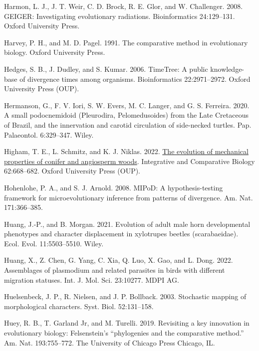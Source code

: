 \documentclass[fleqn,10pt,lineno]{wlpeerj} %
\newlength{\cslhangindent}
\newlength{\cslentryspacingunit} %
\newenvironment{CSLReferences}[2] %
 {%
  \setlength{\parindent}{0pt}
  \ifodd #1
  \let\oldpar\par
  \def\par{\hangindent=\cslhangindent\oldpar}
  \fi
  \setlength{\parskip}{#2\cslentryspacingunit}
 }%
 {}
\begin{document}
\begin{CSLReferences}{1}{0}
\leavevmode{}%
Harmon, L. J., J. T. Weir, C. D. Brock, R. E. Glor, and W. Challenger. 2008. {GEIGER}: Investigating evolutionary radiations. Bioinformatics 24:129--131. Oxford University Press.

\leavevmode{}%
Harvey, P. H., and M. D. Pagel. 1991. The comparative method in evolutionary biology. Oxford University Press.

\leavevmode{}%
Hedges, S. B., J. Dudley, and S. Kumar. 2006. {TimeTree}: A public knowledge-base of divergence times among organisms. Bioinformatics 22:2971--2972. Oxford University Press (OUP).

\leavevmode{}%
Hermanson, G., F. V. Iori, S. W. Evers, M. C. Langer, and G. S. Ferreira. 2020. A small podocnemidoid ({P}leurodira, {P}elomedusoides) from the {L}ate {C}retaceous of {B}razil, and the innervation and carotid circulation of side-necked turtles. Pap. Palaeontol. 6:329--347. Wiley.

\leavevmode{}%
Higham, T. E., L. Schmitz, and K. J. Niklas. 2022. \href{https://doi.org/10.1093/icb/icac103}{The evolution of mechanical properties of conifer and angiosperm woods}. Integrative and Comparative Biology 62:668--682. Oxford University Press ({OUP}).

\leavevmode{}%
Hohenlohe, P. A., and S. J. Arnold. 2008. {MIPoD}: A hypothesis-testing framework for microevolutionary inference from patterns of divergence. Am. Nat. 171:366--385.

\leavevmode{}%
Huang, J.-P., and B. Morgan. 2021. Evolution of adult male horn developmental phenotypes and character displacement in xylotrupes beetles (scarabaeidae). Ecol. Evol. 11:5503--5510. Wiley.

\leavevmode{}%
Huang, X., Z. Chen, G. Yang, C. Xia, Q. Luo, X. Gao, and L. Dong. 2022. Assemblages of plasmodium and related parasites in birds with different migration statuses. Int. J. Mol. Sci. 23:10277. MDPI AG.

\leavevmode{}%
Huelsenbeck, J. P., R. Nielsen, and J. P. Bollback. 2003. Stochastic mapping of morphological characters. Syst. Biol. 52:131--158.

\leavevmode{}%
Huey, R. B., T. Garland Jr, and M. Turelli. 2019. Revisiting a key innovation in evolutionary biology: Felsenstein's {``phylogenies and the comparative method.''} Am. Nat. 193:755--772. The University of Chicago Press Chicago, IL.


\end{CSLReferences}
\end{document}
